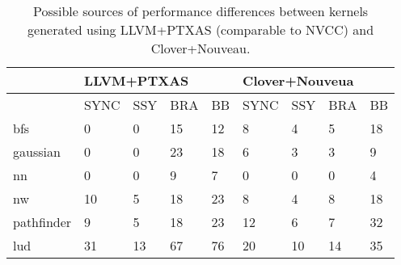 \begin{table*}[h!]
\centering
\begin{tabular}{@{}lllll|llll@{}}
\toprule
           & \multicolumn{4}{l}{LLVM+PTXAS} & \multicolumn{4}{l}{Clover+Nouveua} \\ \midrule
           & SYNC    & SSY   & BRA   & BB   & SYNC     & SSY    & BRA    & BB    \\
bfs        & 0       & 0     & 15    & 12   & 8        & 4      & 5      & 18    \\
gaussian   & 0       & 0     & 23    & 18   & 6        & 3      & 3      & 9     \\
nn         & 0       & 0     & 9     & 7    & 0        & 0      & 0      & 4     \\
nw         & 10      & 5     & 18    & 23   & 8        & 4      & 8      & 18    \\
pathfinder & 9       & 5     & 18    & 23   & 12       & 6      & 7      & 32    \\
lud        & 31      & 13    & 67    & 76   & 20       & 10     & 14     & 35    \\ \bottomrule
\end{tabular}
\caption{\footnotesize{Possible sources of performance differences between kernels generated using LLVM+PTXAS (comparable to NVCC) and Clover+Nouveau.}}
\label{tab:sassdiferences}
\end{table*}